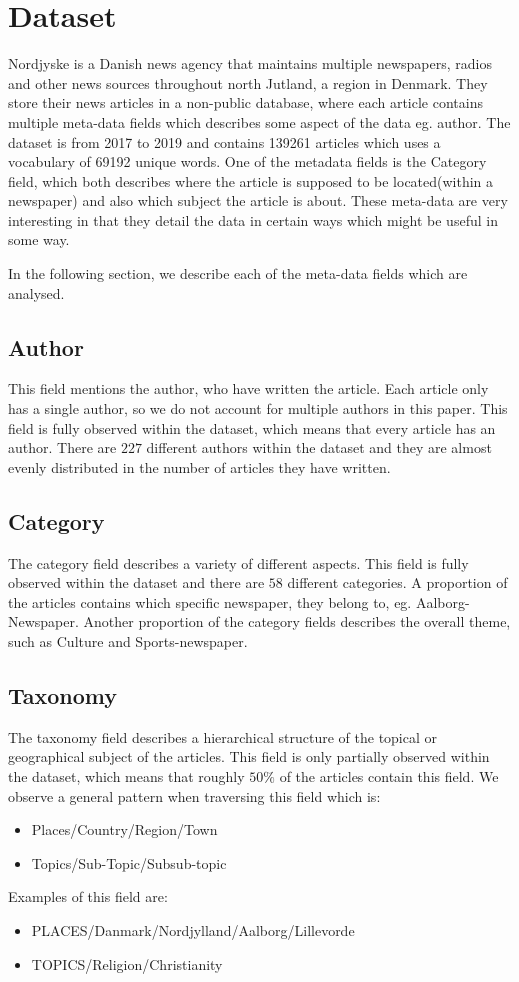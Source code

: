 \section{Dataset}
Nordjyske is a Danish news agency that maintains multiple newspapers, radios and other news sources throughout north Jutland, a region in Denmark.
They store their news articles in a non-public database, where each article contains multiple meta-data fields which describes some aspect of the data eg. author.
The dataset is from 2017 to 2019 and contains 139261 articles which uses a vocabulary of 69192 unique words.
One of the metadata fields is the Category field, which both describes where the article is supposed to be located(within a newspaper) and also which subject the article is about.
These meta-data are very interesting in that they detail the data in certain ways which might be useful in some way.

In the following section, we describe each of the meta-data fields which are analysed.

\subsection{Author}
This field mentions the author, who have written the article.
Each article only has a single author, so we do not account for multiple authors in this paper.
This field is fully observed within the dataset, which means that every article has an author.
There are $227$ different authors within the dataset and they are almost evenly distributed in the number of articles they have written.

\subsection{Category}
The category field describes a variety of different aspects. 
This field is fully observed within the dataset and there are $58$ different categories.
A proportion of the articles contains which specific newspaper, they belong to, eg. Aalborg-Newspaper.
Another proportion of the category fields describes the overall theme, such as Culture and Sports-newspaper.

\subsection{Taxonomy}
The taxonomy field describes a hierarchical structure of the topical or geographical subject of the articles.
This field is only partially observed within the dataset, which means that roughly $50\%$ of the articles contain this field.
We observe a general pattern when traversing this field which is:
\begin{itemize}
	\item Places/Country/Region/Town
	\item Topics/Sub-Topic/Subsub-topic
\end{itemize}
Examples of this field are:
\begin{itemize}
	\item PLACES/Danmark/Nordjylland/Aalborg/Lillevorde
	\item TOPICS/Religion/Christianity
\end{itemize}